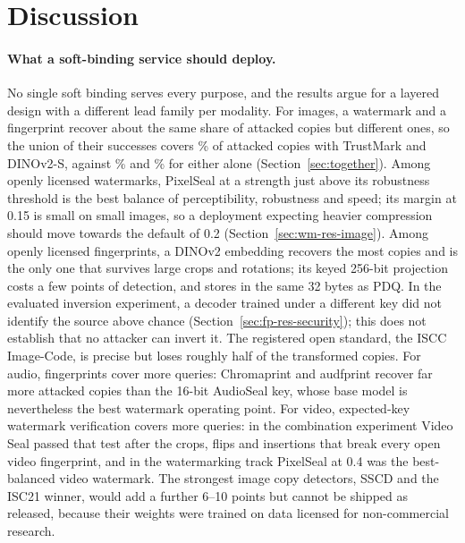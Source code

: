 \section{Discussion}
\label{sec:discussion}

\paragraph{What a soft-binding service should deploy.} No single soft binding serves every purpose, and the results argue for a layered design with a different lead family per modality. For images, a watermark and a fingerprint recover about the same share of attacked copies but different ones, so the union of their successes covers \% of attacked copies with TrustMark and DINOv2-S, against \% and \% for either alone (Section~\ref{sec:together}). Among openly licensed watermarks, PixelSeal at a strength just above its robustness threshold is the best balance of perceptibility, robustness and speed; its margin at 0.15 is small on small images, so a deployment expecting heavier compression should move towards the default of 0.2 (Section~\ref{sec:wm-res-image}). Among openly licensed fingerprints, a DINOv2 embedding recovers the most copies and is the only one that survives large crops and rotations; its keyed 256-bit projection costs a few points of detection, and stores in the same 32 bytes as PDQ. In the evaluated inversion experiment, a decoder trained under a different key did not identify the source above chance (Section~\ref{sec:fp-res-security}); this does not establish that no attacker can invert it. The registered open standard, the ISCC Image-Code, is precise but loses roughly half of the transformed copies. For audio, fingerprints cover more queries: Chromaprint and audfprint recover far more attacked copies than the 16-bit AudioSeal key, whose base model is nevertheless the best watermark operating point. For video, expected-key watermark verification covers more queries: in the combination experiment Video Seal passed that test after the crops, flips and insertions that break every open video fingerprint, and in the watermarking track PixelSeal at 0.4 was the best-balanced video watermark. The strongest image copy detectors, SSCD and the ISC21 winner, would add a further 6--10 points but cannot be shipped as released, because their weights were trained on data licensed for non-commercial research.

